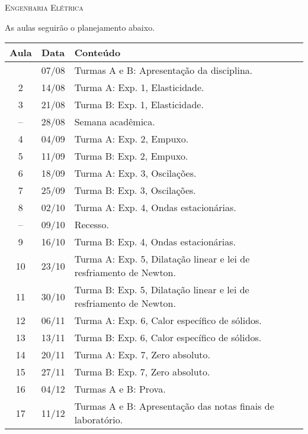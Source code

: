 \vspace{1cm}
\begin{center}
\Large\textsc{Engenharia Elétrica}
\end{center}

As aulas seguirão o planejamento abaixo.
\begin{center}
\begin{longtable}{ccp{70mm}}
\toprule
Aula & Data & Conteúdo \\
\midrule
\endhead
\bottomrule
\endfoot
 1 & 07/08 & Turmas A e B: Apresentação da disciplina. \\
 2 & 14/08 & Turma A: Exp. 1, Elasticidade. \\
 3 & 21/08 & Turma B: Exp. 1, Elasticidade. \\
-- & 28/08 & Semana acadêmica. \\ 
 4 & 04/09 & Turma A: Exp. 2, Empuxo. \\
 5 & 11/09 & Turma B: Exp. 2, Empuxo. \\
 6 & 18/09 & Turma A: Exp. 3, Oscilações. \\
 7 & 25/09 & Turma B: Exp. 3, Oscilações. \\
 8 & 02/10 & Turma A: Exp. 4, Ondas estacionárias. \\
-- & 09/10 & Recesso. \\
 9 & 16/10 & Turma B: Exp. 4, Ondas estacionárias. \\
10 & 23/10 & Turma A: Exp. 5, Dilatação linear e lei de resfriamento de Newton. \\
11 & 30/10 & Turma B: Exp. 5, Dilatação linear e lei de resfriamento de Newton. \\
12 & 06/11 & Turma A: Exp. 6, Calor específico de sólidos. \\
13 & 13/11 & Turma B: Exp. 6, Calor específico de sólidos. \\
14 & 20/11 & Turma A: Exp. 7, Zero absoluto. \\
15 & 27/11 & Turma B: Exp. 7, Zero absoluto. \\
16 & 04/12 & Turmas A e B: Prova. \\
17 & 11/12 & Turmas A e B: Apresentação das notas finais de laboratório.
\end{longtable}
\end{center}

\cleardoublepage

